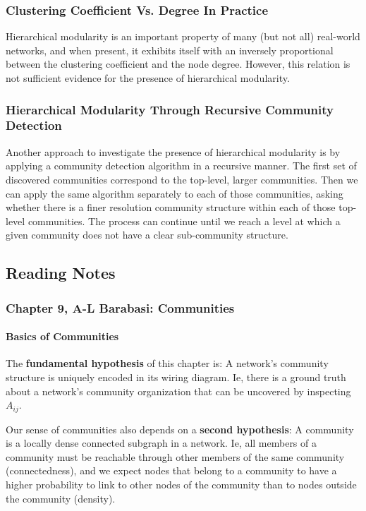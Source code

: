 \documentclass[11pt]{scrartcl} %
\begin{document}
\subsubsection{Clustering Coefficient Vs. Degree In Practice}
Hierarchical modularity is an important property of many (but not all) real-world networks, and when present, it exhibits itself with an inversely proportional between the clustering coefficient and the node degree. However, this relation is not sufficient evidence for the presence of hierarchical modularity. 

\subsubsection{Hierarchical Modularity Through Recursive Community Detection}
Another approach to investigate the presence of hierarchical modularity is by applying a community detection algorithm in a recursive manner. The first set of discovered communities correspond to the top-level, larger communities. Then we can apply the same algorithm separately to each of those communities, asking whether there is a finer resolution community structure within each of those top-level communities. The process can continue until we reach a level at which a given community does not have a clear sub-community structure.


\subsection{Reading Notes}

\subsubsection{Chapter 9, A-L Barabasi: Communities}
\paragraph{Basics of Communities}
The \textbf{fundamental hypothesis} of this chapter is: A network's community structure is uniquely encoded in its wiring diagram. Ie, there is a ground truth about a network's community organization that can be uncovered by inspecting $A_{ij}$.

Our sense of communities also depends on a \textbf{second hypothesis}: A community is a locally dense connected subgraph in a network. Ie, all members of a community must be reachable through other members of the same community (connectedness), and we expect nodes that belong to a community to have a higher probability to link to other nodes of the community than to nodes outside the community (density).
\end{document}
